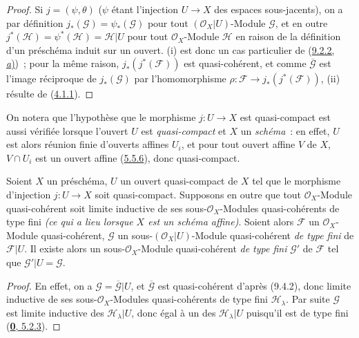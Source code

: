 \begin{proof}
Si $j=(\psi,\theta)$ ($\psi$ étant l'injection $U\to X$ des espaces
sous-jacents), on a par définition $j_*(\mathscr{G})=\psi_*(\mathscr{G})$
pour tout $(\mathscr{O}_X|U)$-Module $\mathscr{G}$, et en outre
$j^*(\mathscr{H})=\psi^*(\mathscr{H})=\mathscr{H}|U$ pour tout
$\mathscr{O}_X$-Module $\mathscr{H}$ en raison de la définition d'un
préschéma induit sur un ouvert. (i) est donc un cas particulier de
(\hyperref[I.9.2.2-fr]{9.2.2, \emph{a})})~; pour la même raison,
$j_*(j^*(\mathscr{F}))$ est quasi-cohérent, et comme
$\overline{\mathscr{G}}$ est l'image réciproque de $j_*(\mathscr{G})$ par
l'homomorphisme $\rho:\mathscr{F}\to j_*(j^*(\mathscr{F}))$, (ii) résulte de
(\hyperref[I.4.1.1-fr]{4.1.1}).
\end{proof}

On notera que l'hypothèse que le morphisme $j:U\to X$ est quasi-compact est
aussi vérifiée lorsque l'ouvert $U$ est \emph{quasi-compact} et $X$ un
\emph{schéma}~: en effet, $U$ est alors réunion finie d'ouverts affines
$U_i$, et pour tout ouvert affine $V$ de $X$, $V\cap U_i$ est un ouvert
affine (\hyperref[I.5.5.6-fr]{5.5.6}), donc quasi-compact.

\begin{corollary}[9.4.3]
\label{I.9.4.3-fr}
Soient $X$ un préschéma, $U$ un ouvert quasi-compact de $X$ tel que le
morphisme d'injection $j:U\to X$ soit quasi-compact. Supposons en outre que
tout $\mathscr{O}_X$-Module quasi-cohérent soit limite inductive de ses
sous-$\mathscr{O}_X$-Modules quasi-cohérents de type fini
\emph{(ce qui a lieu lorsque $X$ est un \emph{schéma affine})}. Soient alors
$\mathscr{F}$ un $\mathscr{O}_X$-Module quasi-cohérent, $\mathscr{G}$ un
sous-$(\mathscr{O}_X|U)$-Module quasi-cohérent \emph{de type fini} de
$\mathscr{F}|U$. Il existe alors un sous-$\mathscr{O}_X$-Module
quasi-cohérent \emph{de type fini} $\mathscr{G}'$ de $\mathscr{F}$ tel que
$\mathscr{G}'|U=\mathscr{G}$.
\end{corollary}

\begin{proof}
En effet, on a $\mathscr{G}=\overline{\mathscr{G}}|U$, et
$\overline{\mathscr{G}}$ est quasi-cohérent d'après (9.4.2), donc limite
inductive de ses sous-$\mathscr{O}_X$-Modules quasi-cohérents de type fini
$\mathscr{H}_\lambda$. Par suite $\mathscr{G}$ est limite inductive des
$\mathscr{H}_\lambda|U$, donc égal à un des $\mathscr{H}_\lambda|U$
puisqu'il est de type fini (\hyperref[0.5.2.3-fr]{\textbf{0}, 5.2.3}).
\end{proof}


